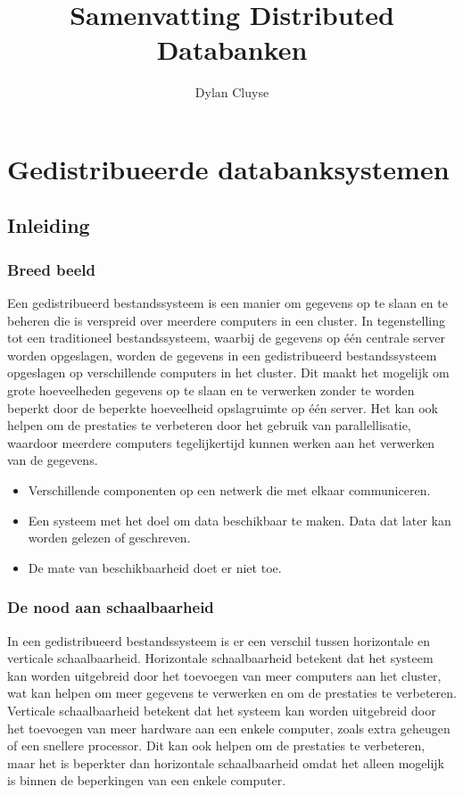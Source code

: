 \documentclass[a4paper,10pt,twoside]{report}
\title{Samenvatting Distributed Databanken}
\author{Dylan {Cluyse}}
\begin{document}
	
\maketitle

\tableofcontents
	
\chapter{Gedistribueerde databanksystemen}

\section{Inleiding}

\subsection{Breed beeld}

Een gedistribueerd bestandssysteem is een manier om gegevens op te slaan en te beheren die is verspreid over meerdere computers in een cluster. In tegenstelling tot een traditioneel bestandssysteem, waarbij de gegevens op één centrale server worden opgeslagen, worden de gegevens in een gedistribueerd bestandssysteem opgeslagen op verschillende computers in het cluster. Dit maakt het mogelijk om grote hoeveelheden gegevens op te slaan en te verwerken zonder te worden beperkt door de beperkte hoeveelheid opslagruimte op één server. Het kan ook helpen om de prestaties te verbeteren door het gebruik van parallellisatie, waardoor meerdere computers tegelijkertijd kunnen werken aan het verwerken van de gegevens.

\begin{itemize}
	\item Verschillende componenten op een netwerk die met elkaar communiceren.
	\item Een systeem met het doel om data beschikbaar te maken. Data dat later kan worden gelezen of geschreven.
	\item De mate van beschikbaarheid doet er niet toe.
\end{itemize}

\subsection{De nood aan schaalbaarheid}

In een gedistribueerd bestandssysteem is er een verschil tussen horizontale en verticale schaalbaarheid. Horizontale schaalbaarheid betekent dat het systeem kan worden uitgebreid door het toevoegen van meer computers aan het cluster, wat kan helpen om meer gegevens te verwerken en om de prestaties te verbeteren. Verticale schaalbaarheid betekent dat het systeem kan worden uitgebreid door het toevoegen van meer hardware aan een enkele computer, zoals extra geheugen of een snellere processor. Dit kan ook helpen om de prestaties te verbeteren, maar het is beperkter dan horizontale schaalbaarheid omdat het alleen mogelijk is binnen de beperkingen van een enkele computer.
\end{document}
